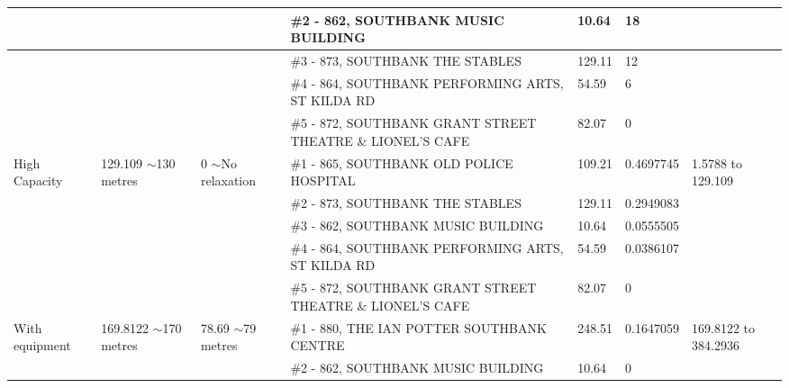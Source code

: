 \begin{table}[H]
{\begin{tabular}{|l|l|l|l|l|l|l|}
                        &                           &                          & \#2 - 862, SOUTHBANK MUSIC BUILDING                        & 10.64         & 18              &                           \\ \hline
                        &                           &                          & \#3 - 873, SOUTHBANK THE STABLES                           & 129.11        & 12              &                           \\ \hline
                        &                           &                          & \#4 - 864, SOUTHBANK PERFORMING ARTS, ST KILDA RD          & 54.59         & 6               &                           \\ \hline
                        &                           &                          & \#5 - 872, SOUTHBANK GRANT STREET THEATRE \& LIONEL'S CAFE & 82.07         & 0               &                           \\ \hline
High Capacity           & 129.109 $\sim$130 metres  & 0 $\sim$No relaxation    & \#1 - 865, SOUTHBANK OLD POLICE HOSPITAL                   & 109.21        & 0.4697745       & 1.5788 to 129.109         \\ \hline
                        &                           &                          & \#2 - 873, SOUTHBANK THE STABLES                           & 129.11        & 0.2949083       &                           \\ \hline
                        &                           &                          & \#3 - 862, SOUTHBANK MUSIC BUILDING                        & 10.64         & 0.0555505       &                           \\ \hline
                        &                           &                          & \#4 - 864, SOUTHBANK PERFORMING ARTS, ST KILDA RD          & 54.59         & 0.0386107       &                           \\ \hline
                        &                           &                          & \#5 - 872, SOUTHBANK GRANT STREET THEATRE \& LIONEL'S CAFE & 82.07         & 0               &                           \\ \hline
With equipment         & 169.8122 $\sim$170 metres & 78.69 $\sim$79 metres    & \#1 - 880, THE IAN POTTER SOUTHBANK CENTRE                 & 248.51        & 0.1647059       & 169.8122 to 384.2936      \\ \hline
                        &                           &                          & \#2 - 862, SOUTHBANK MUSIC BUILDING                        & 10.64         & 0               &                           \\ \hline

\end{tabular}}
\end{table}

